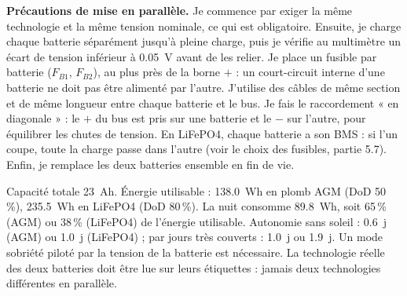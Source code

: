 \textbf{Précautions de mise en parallèle.} Je commence par exiger la même technologie et la même tension nominale, ce qui est obligatoire. Ensuite, je charge chaque batterie séparément jusqu'à pleine charge, puis je vérifie au multimètre un écart de tension inférieur à \qty{0,05}{V} avant de les relier. Je place un fusible par batterie ($F_{B1}$, $F_{B2}$), au plus près de la borne $+$ : un court-circuit interne d'une batterie ne doit pas être alimenté par l'autre. J'utilise des câbles de même section et de même longueur entre chaque batterie et le bus. Je fais le raccordement « en diagonale » : le $+$ du bus est pris sur une batterie et le $-$ sur l'autre, pour équilibrer les chutes de tension. En LiFePO4, chaque batterie a son BMS : si l'un coupe, toute la charge passe dans l'autre (voir le choix des fusibles, partie 5.7). Enfin, je remplace les deux batteries ensemble en fin de vie.

\begin{aretenir}
Capacité totale \qty{23}{Ah}. Énergie utilisable : \qty{138,0}{Wh} en plomb AGM (DoD 50\,\%), \qty{235,5}{Wh} en LiFePO4 (DoD 80\,\%). La nuit consomme \qty{89,8}{Wh}, soit 65\,\% (AGM) ou 38\,\% (LiFePO4) de l'énergie utilisable. Autonomie sans soleil : \qty{0,6}{j} (AGM) ou \qty{1,0}{j} (LiFePO4) ; par jours très couverts : \qty{1,0}{j} ou \qty{1,9}{j}. Un mode sobriété piloté par la tension de la batterie est nécessaire. La technologie réelle des deux batteries doit être lue sur leurs étiquettes : jamais deux technologies différentes en parallèle.
\end{aretenir}
